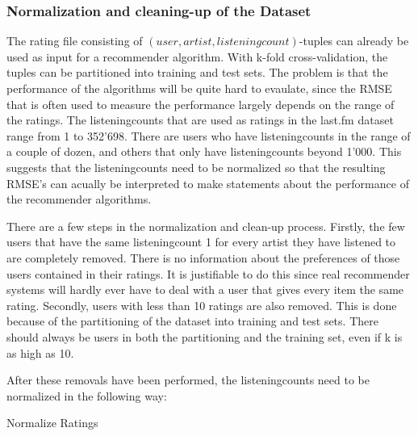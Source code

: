 \subsubsection{Normalization and cleaning-up of the Dataset}
\label{sst:normalizationandcleaningup} The rating file consisting of $(user, artist, listeningcount)$-tuples can already be used as input for a recommender algorithm. With k-fold cross-validation, the tuples can be partitioned into training and test sets. The problem is that the performance of the algorithms will be quite hard to evaulate, since the RMSE that is often used to measure the performance largely depends on the range of the ratings. The listeningcounts that are used as ratings in the last.fm dataset range from 1 to 352'698. There are users who have listeningcounts in the range of a couple of dozen, and others that only have listeningcounts beyond 1'000. This suggests that the listeningcounts need to be normalized so that the resulting RMSE's can acually be interpreted to make statements about the performance of the recommender algorithms.

There are a few steps in the normalization and clean-up process. Firstly, the few users that have the same listeningcount 1 for every artist they have listened to are completely removed. There is no information about the preferences of those users contained in their ratings. It is justifiable to do this since real recommender systems will hardly ever have to deal with a user that gives every item the same rating. Secondly, users with less than 10 ratings are also removed. This is done because of the partitioning of the dataset into training and test sets. There should always be users in both the partitioning and the training set, even if k is as high as 10.

After these removals have been performed, the listeningcounts need to be normalized in the following way:
\newline

\begin{algorithm}[H]
\SetAlgoLined
{}
\caption{Normalize Ratings}
\end{algorithm}

